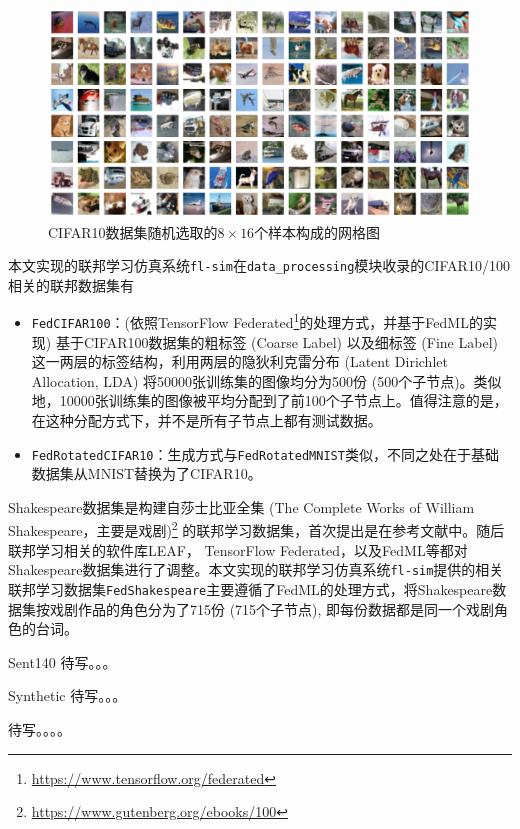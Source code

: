 \begin{figure}[ht]
\centering
\includegraphics[width=\textwidth]{figures/cifar10_random_grid_view.pdf}
\caption{CIFAR10数据集随机选取的$8\times 16$个样本构成的网格图}
\label{fig:cifar10_random_grid_view}
\end{figure}

本文实现的联邦学习仿真系统\texttt{fl-sim}在\texttt{data\_processing}模块收录的CIFAR10/100相关的联邦数据集有
\begin{itemize}
    \item \texttt{FedCIFAR100}：(依照TensorFlow Federated\footnote{\url{https://www.tensorflow.org/federated}}的处理方式，并基于FedML\cite{he_2020_fedml}的实现) 基于CIFAR100数据集的粗标签 (Coarse Label) 以及细标签 (Fine Label) 这一两层的标签结构，利用两层的隐狄利克雷分布 (Latent Dirichlet Allocation, LDA) \cite{Li_2006_LDA}将50000张训练集的图像均分为500份 (500个子节点)。类似地，10000张训练集的图像被平均分配到了前100个子节点上。值得注意的是，在这种分配方式下，并不是所有子节点上都有测试数据。
    \item \texttt{FedRotatedCIFAR10}：生成方式与\texttt{FedRotatedMNIST}\cite{Ghosh_2022_cfl}类似，不同之处在于基础数据集从MNIST替换为了CIFAR10。
\end{itemize}

Shakespeare数据集是构建自莎士比亚全集 (The Complete Works of William Shakespeare，主要是戏剧)\footnote{\url{https://www.gutenberg.org/ebooks/100}} 的联邦学习数据集，首次提出是在参考文献\parencite{mcmahan2017fed_avg}中。随后联邦学习相关的软件库LEAF\cite{caldas2018_leaf}， TensorFlow Federated，以及FedML\cite{he_2020_fedml}等都对Shakespeare数据集进行了调整。本文实现的联邦学习仿真系统\texttt{fl-sim}提供的相关联邦学习数据集\texttt{FedShakespeare}主要遵循了FedML\cite{he_2020_fedml}的处理方式，将Shakespeare数据集按戏剧作品的角色分为了715份 (715个子节点), 即每份数据都是同一个戏剧角色的台词。

Sent140  待写。。。

Synthetic  待写。。。


待写。。。。
